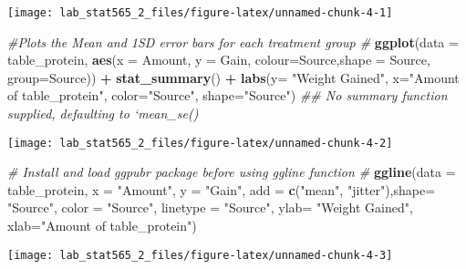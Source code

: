 \documentclass[]{article}
\newenvironment{Shaded}{\begin{snugshade}}{\end{snugshade}}
\newcommand{\CommentTok}[1]{\textcolor[rgb]{0.56,0.35,0.01}{\textit{#1}}}
\newcommand{\DataTypeTok}[1]{\textcolor[rgb]{0.13,0.29,0.53}{#1}}
\newcommand{\KeywordTok}[1]{\textcolor[rgb]{0.13,0.29,0.53}{\textbf{#1}}}
\newcommand{\NormalTok}[1]{#1}
\newcommand{\OperatorTok}[1]{\textcolor[rgb]{0.81,0.36,0.00}{\textbf{#1}}}
\newcommand{\StringTok}[1]{\textcolor[rgb]{0.31,0.60,0.02}{#1}}
\begin{document}
\texttt{[image: lab\_stat565\_2\_files/figure-latex/unnamed-chunk-4-1]}

\begin{Shaded}
\begin{Highlighting}[]

\CommentTok{#Plots the Mean and 1SD error bars for each treatment group #}
\KeywordTok{ggplot}\NormalTok{(}\DataTypeTok{data =}\NormalTok{ table_protein, }\KeywordTok{aes}\NormalTok{(}\DataTypeTok{x =}\NormalTok{ Amount, }\DataTypeTok{y =}\NormalTok{ Gain, }\DataTypeTok{colour=}\NormalTok{Source,}\DataTypeTok{shape =}\NormalTok{ Source, }\DataTypeTok{group=}\NormalTok{Source)) }\OperatorTok{+}
\StringTok{  }\KeywordTok{stat_summary}\NormalTok{() }\OperatorTok{+}\StringTok{ }\KeywordTok{labs}\NormalTok{(}\DataTypeTok{y=} \StringTok{"Weight Gained"}\NormalTok{, }\DataTypeTok{x=}\StringTok{"Amount of table_protein"}\NormalTok{, }\DataTypeTok{color=}\StringTok{"Source"}\NormalTok{, }\DataTypeTok{shape=}\StringTok{"Source"}\NormalTok{)}
\CommentTok{## No summary function supplied, defaulting to `mean_se()}
\end{Highlighting}
\end{Shaded}

\texttt{[image: lab\_stat565\_2\_files/figure-latex/unnamed-chunk-4-2]}

\begin{Shaded}
\begin{Highlighting}[]

\CommentTok{# Install and load ggpubr package before using ggline function # }
\KeywordTok{ggline}\NormalTok{(}\DataTypeTok{data =}\NormalTok{ table_protein, }\DataTypeTok{x =} \StringTok{"Amount"}\NormalTok{, }\DataTypeTok{y =} \StringTok{"Gain"}\NormalTok{, }\DataTypeTok{add =} \KeywordTok{c}\NormalTok{(}\StringTok{"mean"}\NormalTok{, }\StringTok{"jitter"}\NormalTok{),}\DataTypeTok{shape=} \StringTok{"Source"}\NormalTok{,  }\DataTypeTok{color =} \StringTok{"Source"}\NormalTok{, }\DataTypeTok{linetype =} \StringTok{"Source"}\NormalTok{, }\DataTypeTok{ylab=} \StringTok{"Weight Gained"}\NormalTok{, }\DataTypeTok{xlab=}\StringTok{"Amount of table_protein"}\NormalTok{)}
\end{Highlighting}
\end{Shaded}

\texttt{[image: lab\_stat565\_2\_files/figure-latex/unnamed-chunk-4-3]}
\end{document}
